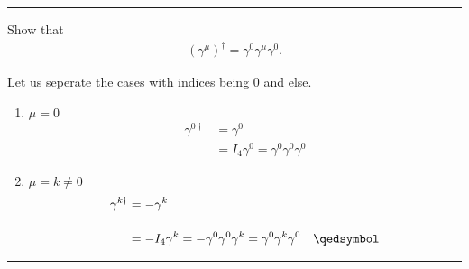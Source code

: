 \noindent\rule{7in}{1.5pt}


\begin{problem}{4.8}
Show that
\begin{align*}
    \left(\gamma^\mu\right)^\dagger = \gamma^0 \gamma^\mu \gamma^0.
\end{align*}
\end{problem}
\begin{solution}
Let us seperate the cases with indices being 0 and else. 
\begin{enumerate}[label=(\alph*)]
    \item $\mu=0$
        \begin{align*}
            \gamma^{0\dagger} &= \gamma^0  \\[0.15in]
                              &= I_4 \gamma^0  = \gamma^0\gamma^0\gamma^0 
        \end{align*}
    \item $\mu=k\neq 0$
        \begin{align*}
            \gamma^{k\dagger} &= -\gamma^k  \\[0.15in]
                              &= -I_4 \gamma^k  = -\gamma^0\gamma^0\gamma^k  = \gamma^0\gamma^k\gamma^0 \qed
        \end{align*}
\end{enumerate}
\end{solution}

\noindent\rule{7in}{1.5pt}


